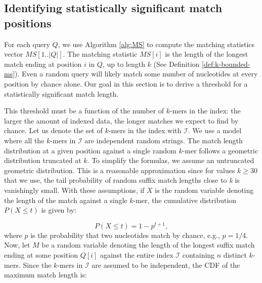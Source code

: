 \documentclass[unnumsec,webpdf,modern,large]{biorxiv}%
\theoremstyle{thmstyleone}%
\theoremstyle{thmstyletwo}%
\theoremstyle{thmstylethree}%
\begin{document}
\subsection{Identifying statistically significant match positions}\label{sec:random-match-model}
For each query $Q$, we use Algorithm \ref{alg:MS} to compute the matching statistics vector $MS[1..|Q|]$. The matching statistic $MS[i]$ is the length of the longest match ending at position $i$ in $Q$, up to length $k$ (See Definition \ref{def:k-bounded-ms}). Even a random query will likely match some number of nucleotides at every position by chance alone. Our goal in this section is to derive a threshold for a statistically significant match length.

This threshold must be a function of the number of $k$-mers in the index: the larger the amount of indexed data, the longer matches we expect to find by chance. Let us denote the set of $k$-mers in the index with $\mathcal I$. We use a model where all the $k$-mers in $\mathcal I$ are independent random strings. The match length distribution at a given position against a single random $k$-mer follows a geometric distribution truncated at $k$. To simplify the formulas, we assume an untruncated geometric distribution. This is a reasonable approximation since for values $k \geq 30$ that we use, the tail probability of random suffix match lengths close to \emph{k} is vanishingly small. With these assumptions, if $X$ is the random variable denoting the length of the match against a single $k$-mer, the cumulative distribution $P(X \leq t)$ is given by:

\begin{equation}
    P\left(X \leq t\right) = 1 - p^{t + 1},
\label{geom-distribution}
\end{equation}
where $p$ is the probability that two nucleotides match by chance, e.g., $p = 1/4$. Now, let $M$ be a random variable denoting the length of the longest suffix match ending at some position $Q[i]$ against the entire index $\mathcal{I}$ containing $n$ distinct $k$-mers. Since the $k$-mers in $\mathcal I$ are assumed to be independent, the CDF of the maximum match length is:

\end{document}
